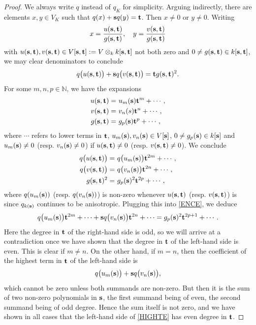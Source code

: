 \documentclass[10pt,a4paper]{amsart}
\begin{document}
\begin{proof} We always write $q$ instead of $q_K$ for simplicity. Arguing indirectly, there are elements  $x,y \in V_K$ such that $q(x) + {\bf s} q(y) = {\bf t}$. Then $x \ne 0$ or $y \ne 0$.	Writing
	\begin{align*}
		x = \frac{u({\bf s},{\bf t})}{g({\bf s},{\bf t})}, \quad y = \frac{v({\bf s},{\bf t})}{g({\bf s},{\bf t})}
	\end{align*}
	with $u({\bf s},{\bf t}),v({\bf s},{\bf t}) \in V[{\bf s},{\bf t}] := V \otimes_k k[{\bf s},{\bf t}]$ not both zero and $0 \ne g({\bf s},{\bf t}) \in k[{\bf s},{\bf t}]$, we may clear denominators to conclude
	\begin{align}
		\label{ENCE} q\big(u({\bf s},{\bf t})\big) + {\bf s} q\big(v({\bf s},{\bf t})\big) = {\bf t} g({\bf s},{\bf t})^2.
	\end{align}
	For some $m,n,p \in \mathbb{N}$, we have the expansions
	\begin{align*}
		u({\bf s},{\bf t}) =\,\,&u_m({\bf s}){\bf t}^m + \cdots, \\
		v({\bf s},{\bf t}) =\,\,&v_n(s){\bf t}^n + \cdots, \\
		g({\bf s},{\bf t}) =\,\,&g_p({\bf s}){\bf t}^p + \cdots,  
	\end{align*}
	where $\cdots$ refers to lower terms in ${\bf t}$, $u_m({\bf s}), v_n({\bf s}) \in V[{\bf s}]$, $0 \ne g_p({\bf s}) \in k[{\bf s}]$ and $u_m({\bf s}) \ne 0$ (resp. $v_n({\bf s}) \ne 0$) if $u({\bf s},{\bf t}) \ne 0$ (resp. $v({\bf s},{\bf t}) \ne0$). We conclude
	\begin{align*}
		q\big(u({\bf s},{\bf t})\big) =\,\,&q\big(u_m({\bf s})\big){\bf t}^{2m} + \cdots, \\
		q\big(v({\bf s},{\bf t})\big) =\,\,& q\big(v_n({\bf s})\big){\bf t}^{2n} + \cdots, \\
		g({\bf s},{\bf t})^2 =\,\,&g_p({\bf s})^2{\bf t}^{2p} + \cdots,
	\end{align*}
	where $q(u_m({\bf s}))$ (resp. $q(v_n({\bf s}))$) is non-zero whenever $u({\bf s},{\bf t})$ (resp. $v({\bf s},{\bf t})$) is since $q_{k({\bf s})}$ continues to be anisotropic. Plugging this into \eqref{ENCE}, we deduce
	\begin{align}
		\label{HIGHTE} q\big(u_m({\bf s})\big){\bf t}^{2m} + \cdots + {\bf s} q\big(v_n({\bf s})\big){\bf t}^{2n} + \cdots = g_p({\bf s})^2{\bf t}^{2p+1} + \cdots.
	\end{align}
	Here the degree in ${\bf t}$ of the right-hand side is odd, so we will arrive at a contradiction once we have shown that the degree in ${\bf t}$ of the left-hand side is even. This is clear if $m \ne n$. On the other hand, if $m = n$, then the coefficient of the highest term in ${\bf t}$ of the left-hand side is 
	\[
	q\big(u_m({\bf s})\big) + {\bf s} q\big(v_n({\bf s})\big),
	\]
	which cannot be zero unless both summands are non-zero. But then it is the sum of two non-zero polynomials in ${\bf s}$, the first summand being of even, the second summand being of odd degree. Hence the sum itself is not zero, and we have shown in all cases that the left-hand side of \eqref{HIGHTE} has even degree in ${\bf t}$. 
\end{proof}
\end{document}
